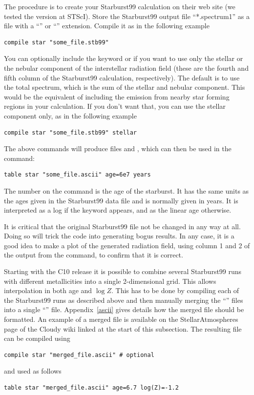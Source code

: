The procedure is to create your Starburst99 calculation on their web site
(we tested the version at STScI).
Store the Starburst99 output file ``*.spectrum1'' as
a file with a ``''  or ``'' extension.
Compile it as in the following example
\begin{verbatim}
compile star "some_file.stb99"
\end{verbatim}
You can optionally include the keyword  or
 if you want to use only the stellar or the nebular
component of the interstellar radiation field (these are the fourth and fifth
column of the Starburst99 calculation, respectively). The default is to use
the total spectrum, which is the sum of the stellar and nebular component.
This would be the equivalent of including the emission from nearby star
forming regions in your calculation. If you don't want that, you can use the
stellar component only, as in the following example
\begin{verbatim}
compile star "some_file.stb99" stellar
\end{verbatim}
The above commands will produce files  and
, which can then
be used in the  command:
\begin{verbatim}
table star "some_file.ascii" age=6e7 years
\end{verbatim}

The number on the  command is the
age of the starburst.  It has the same units as the ages given in the
Starburst99 data file and is normally given in years.
It is interpreted as a log if the keyword  appears,
and as the linear age otherwise.

It is critical that the original Starburst99 file not be
changed in any way at all.
Doing so will trick the code into generating bogus results.
In any case, it is a good idea to make a plot of the generated
radiation field,
using column 1 and 2 of the output from
the  command, to confirm that it is correct.

Starting with the C10 release it is possible to combine several
Starburst99 runs with different metallicities into a single 2-dimensional
grid. This allows interpolation in both age and $\log Z$. This has
to be done by compiling each of the Starburst99 runs as described above
and then manually merging the ``'' files into a single
``'' file. Appendix~\ref{ascii} gives details how the merged
file should be formatted. An example of a merged file is available on the
StellarAtmospheres page of the Cloudy wiki linked at the start of this subsection.
The resulting file can be compiled using
\begin{verbatim}
compile star "merged_file.ascii" # optional
\end{verbatim}
and used as follows
\begin{verbatim}
table star "merged_file.ascii" age=6.7 log(Z)=-1.2
\end{verbatim}

